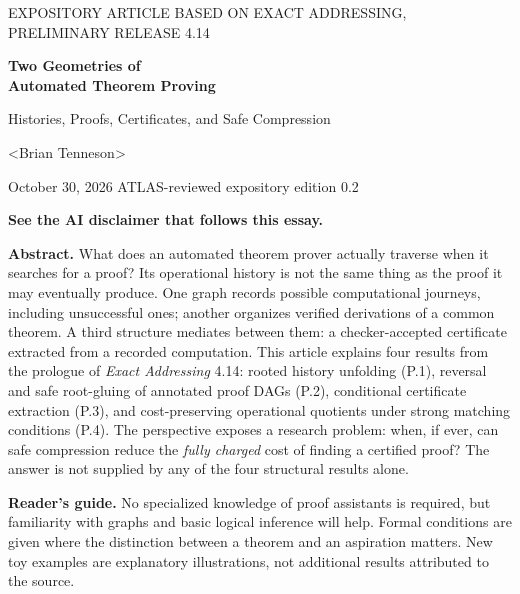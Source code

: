 \documentclass[11pt,letterpaper]{article}
\theoremstyle{plaincompact}
\newcommand{\anglename}{\textless{}Brian Tenneson\textgreater{}}
\begin{document}
\thispagestyle{empty}
\begin{center}
{\small\sffamily EXPOSITORY ARTICLE \quad\textbullet\quad BASED ON EXACT ADDRESSING, PRELIMINARY RELEASE 4.14}\par
\vspace{0.6cm}
{\Huge\sffamily\bfseries Two Geometries of\\[3pt] Automated Theorem Proving}\par
\vspace{0.25cm}
{\large\sffamily Histories, Proofs, Certificates, and Safe Compression}\par
\vspace{0.5cm}
{\large \anglename}\par
\vspace{0.12cm}
{\small October 30, 2026 \quad\textbullet\quad ATLAS-reviewed expository edition 0.2}\par
\vspace{0.35cm}
{\normalsize\bfseries See the AI disclaimer that follows this essay.}\par
\end{center}
\vspace{0.2cm}
\noindent\textbf{Abstract.} What does an automated theorem prover actually traverse when it searches for a proof? Its operational history is not the same thing as the proof it may eventually produce. One graph records possible computational journeys, including unsuccessful ones; another organizes verified derivations of a common theorem. A third structure mediates between them: a checker-accepted certificate extracted from a recorded computation. This article explains four results from the prologue of \emph{Exact Addressing} 4.14: rooted history unfolding (P.1), reversal and safe root-gluing of annotated proof DAGs (P.2), conditional certificate extraction (P.3), and cost-preserving operational quotients under strong matching conditions (P.4). The perspective exposes a research problem: when, if ever, can safe compression reduce the \emph{fully charged} cost of finding a certified proof? The answer is not supplied by any of the four structural results alone.

\medskip
\noindent\textbf{Reader's guide.} No specialized knowledge of proof assistants is required, but familiarity with graphs and basic logical inference will help. Formal conditions are given where the distinction between a theorem and an aspiration matters. New toy examples are explanatory illustrations, not additional results attributed to the source.
\end{document}
